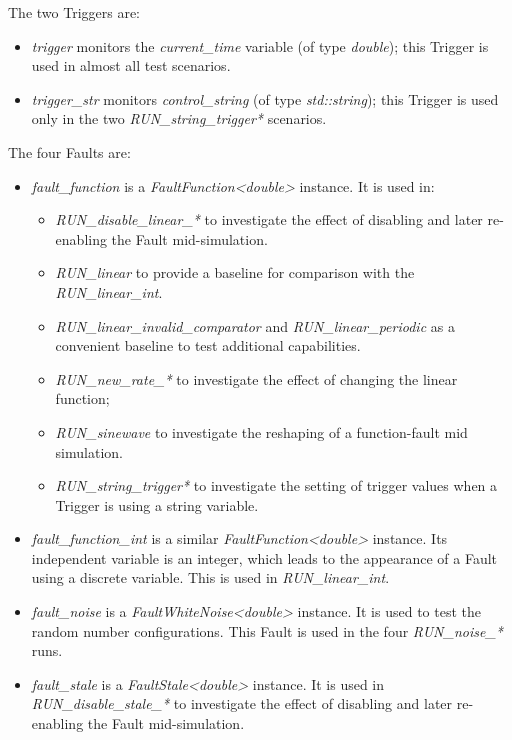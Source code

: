 \documentclass[11pt,fleqn]{report}
\begin{document}
The two Triggers are:
\begin{itemize}
  \item \textit{trigger} monitors the \textit{current\_time} variable (of
        type \textit{double});
        this Trigger is used in almost all test scenarios.
  \item \textit{trigger\_str} monitors \textit{control\_string} (of type
        \textit{std::string}); this Trigger is used only in the
        two \textit{RUN\_string\_trigger*} scenarios.
\end{itemize}

The four Faults are:
\begin{itemize}
  \item \textit{fault\_function} is a \textit{FaultFunction<double>} instance.
       It is used in:
  \begin{itemize}
    \item \textit{RUN\_disable\_linear\_*} to investigate the effect of
          disabling and later re-enabling the Fault mid-simulation.
    \item \textit{RUN\_linear} to provide a baseline for comparison with the
          \textit{RUN\_linear\_int}.
    \item \textit{RUN\_linear\_invalid\_comparator} and
          \textit{RUN\_linear\_periodic} as a convenient baseline to test
          additional capabilities.
    \item \textit{RUN\_new\_rate\_*} to investigate the effect of changing
          the linear function;
    \item \textit{RUN\_sinewave} to investigate the reshaping of a
          function-fault mid simulation.
    \item \textit{RUN\_string\_trigger*} to investigate the setting of
          trigger values when a Trigger is using a string variable.
  \end{itemize}
  \item \textit{fault\_function\_int} is a similar
        \textit{FaultFunction<double>}
        instance. Its independent variable is an integer, which leads to the
        appearance of a Fault using a discrete variable. This is used in
        \textit{RUN\_linear\_int}.
  \item \textit{fault\_noise} is a \textit{FaultWhiteNoise<double>} instance.
        It is used to test the random number configurations. This
        Fault is used in the four \textit{RUN\_noise\_*} runs.
  \item \textit{fault\_stale} is a \textit{FaultStale<double>} instance.
        It is used in \textit{RUN\_disable\_stale\_*} to investigate the effect
        of disabling and later re-enabling the Fault mid-simulation.
\end{itemize}
\end{document}

